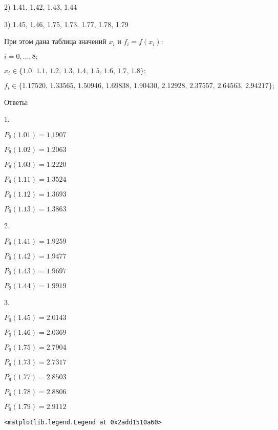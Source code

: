 \documentclass[11pt, russian]{article}
\makeatletter
\newcommand{\boxspacing}{\kern\kvtcb@left@rule\kern\kvtcb@boxsep}
\newcommand{\prompt}[4]{
        {\ttfamily\llap{{\color{#2}[#3]:\hspace{3pt}#4}}\vspace{-\baselineskip}}
    }
\makeatother
\begin{document}
    
    2) 1.41, 1.42, 1.43, 1.44

    
    3) 1.45, 1.46, 1.75, 1.73, 1.77, 1.78, 1.79

    
    При этом дана таблица значений $x_i$ и $f_i=f(x_i)$:

    
    $i=0,\ldots,8;$

    
    $x_i\in\{1.0,\, 1.1,\, 1.2,\, 1.3,\, 1.4,\, 1.5,\, 1.6,\, 1.7,\, 1.8\};$

    
    $f_i\in\{1.17520,\, 1.33565,\, 1.50946,\, 1.69838,\, 1.90430,\,            2.12928,\, 2.37557,\, 2.64563,\, 2.94217\};$

    
    Ответы:

    
    1.

    
    $P_9 (1.01) = 1.1907$

    
    $P_9 (1.02) = 1.2063$

    
    $P_9 (1.03) = 1.2220$

    
    $P_9 (1.11) = 1.3524$

    
    $P_9 (1.12) = 1.3693$

    
    $P_9 (1.13) = 1.3863$

    
    2.

    
    $P_9 (1.41) = 1.9259$

    
    $P_9 (1.42) = 1.9477$

    
    $P_9 (1.43) = 1.9697$

    
    $P_9 (1.44) = 1.9919$

    
    3.

    
    $P_9 (1.45) = 2.0143$

    
    $P_9 (1.46) = 2.0369$

    
    $P_9 (1.75) = 2.7904$

    
    $P_9 (1.73) = 2.7317$

    
    $P_9 (1.77) = 2.8503$

    
    $P_9 (1.78) = 2.8806$

    
    $P_9 (1.79) = 2.9112$

    
            \begin{tcolorbox}[breakable, size=fbox, boxrule=.5pt, pad at break*=1mm, opacityfill=0]
\prompt{Out}{outcolor}{270}{\boxspacing}
\begin{Verbatim}[commandchars=\\\{\}]
<matplotlib.legend.Legend at 0x2add1510a60>
\end{Verbatim}
\end{tcolorbox}
        
    \begin{center}
    \end{center}
    { \hspace*{\fill} \\}
    

    
    
    
\end{document}
